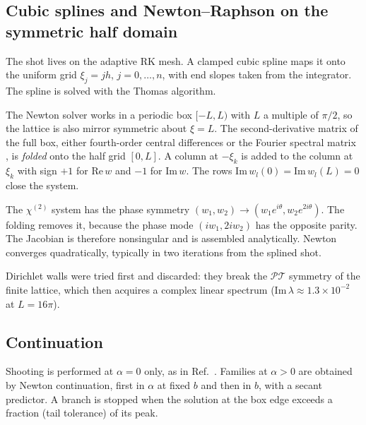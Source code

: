 \documentclass[pra,twocolumn,superscriptaddress,longbibliography]{revtex4-2}
\newcommand{\PT}{\mathcal{PT}}
\newcommand{\chit}{\chi^{(2)}}
\newcommand{\Img}{\mathrm{Im}\,}
\newcommand{\Rea}{\mathrm{Re}\,}
\begin{document}
\subsection{Cubic splines and Newton--Raphson on the symmetric half domain}
The shot lives on the adaptive RK mesh. A clamped cubic spline \cite{deBoor1978} maps it onto the
uniform grid $\xi_j = jh$, $j=0,\dots,n$, with end slopes taken from the integrator. The spline is
solved with the Thomas algorithm.

The Newton solver works in a periodic box $[-L,L)$ with $L$ a multiple of $\pi/2$, so the lattice
is also mirror symmetric about $\xi=L$. The second-derivative matrix of the full box, either
fourth-order central differences or the Fourier spectral matrix \cite{Trefethen2000}, is
\emph{folded} onto the half grid $[0,L]$. A column at $-\xi_k$ is added to the column at $\xi_k$
with sign $+1$ for $\Rea w$ and $-1$ for $\Img w$. The rows $\Img w_l(0)=\Img w_l(L)=0$ close the
system.

The $\chit$ system has the phase symmetry $(w_1,w_2)\to(w_1e^{i\theta},w_2e^{2i\theta})$. The
folding removes it, because the phase mode $(iw_1,2iw_2)$ has the opposite parity. The Jacobian is
therefore nonsingular and is assembled analytically. Newton converges quadratically, typically in
two iterations from the splined shot.

Dirichlet walls were tried first and discarded: they break the $\PT$ symmetry of the finite
lattice, which then acquires a complex linear spectrum ($\Img\lambda\approx1.3\times10^{-2}$ at
$L=16\pi$).

\subsection{Continuation}
Shooting is performed at $\alpha=0$ only, as in Ref.~\cite{MKM2013}. Families at $\alpha>0$ are
obtained by Newton continuation, first in $\alpha$ at fixed $b$ and then in $b$, with a secant
predictor. A branch is stopped when the solution at the box edge exceeds a fraction (tail
tolerance) of its peak.
\end{document}
